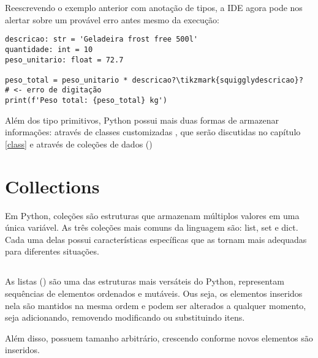 Reescrevendo o exemplo anterior com anotação de tipos, a IDE agora pode nos alertar sobre um provável erro antes
mesmo da execução:
\begin{verbatim}
descricao: str = 'Geladeira frost free 500l'
quantidade: int = 10
peso_unitario: float = 72.7

peso_total = peso_unitario * descricao?\tikzmark{squigglydescricao}?   # <- erro de digitação
print(f'Peso total: {peso_total} kg')
\end{verbatim}
%

Além dos tipo primitivos, Python possui mais duas formas de armazenar informações: através de classes customizadas
, que serão discutidas no capítulo \ref{class} e através de coleções de dados ()




\section{Collections}

Em Python, coleções são estruturas que armazenam múltiplos valores em uma única variável.
As três coleções mais comuns da linguagem são: list, set e dict.
Cada uma delas possui características específicas que as tornam mais adequadas para diferentes situações.




\subsection{}
As listas () são uma das estruturas mais versáteis do Python, representam sequências de elementos
ordenados e mutáveis.
Ous seja, os elementos inseridos nela são mantidos na mesma ordem e podem ser alterados a qualquer momento,
seja adicionando, removendo modificando ou substituindo itens.

Além disso, possuem tamanho arbitrário, crescendo conforme novos elementos são inseridos.

